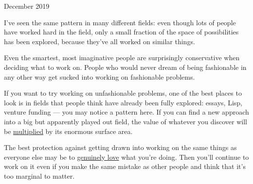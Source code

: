 December 2019

I've seen the same pattern in many different fields: even though lots of
people have worked hard in the field, only a small fraction of the space
of possibilities has been explored, because they've all worked on
similar things.

Even the smartest, most imaginative people are surprisingly conservative
when deciding what to work on. People who would never dream of being
fashionable in any other way get sucked into working on fashionable
problems.

If you want to try working on unfashionable problems, one of the best
places to look is in fields that people think have already been fully
explored: essays, Lisp, venture funding --- you may notice a pattern
here. If you can find a new approach into a big but apparently played
out field, the value of whatever you discover will be
\href{sun.html}{multiplied} by its enormous surface area.

The best protection against getting drawn into working on the same
things as everyone else may be to \href{genius.html}{genuinely love}
what you're doing. Then you'll continue to work on it even if you make
the same mistake as other people and think that it's too marginal to
matter.
